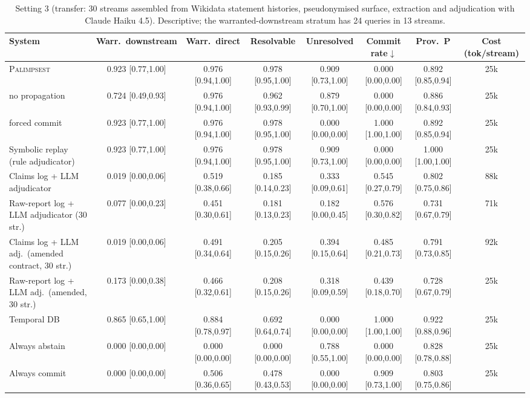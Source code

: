 \begin{table}\centering\footnotesize\setlength{\tabcolsep}{3.5pt}
\caption{Setting 3 (transfer: 30 streams assembled from Wikidata statement histories, pseudonymised surface, extraction and adjudication with Claude Haiku 4.5). Descriptive; the warranted-downstream stratum has 24 queries in 13 streams.}\label{tab:s3}
\begin{tabular}{lccccccc}
\toprule
System & Warr.\ downstream & Warr.\ direct & Resolvable & Unresolved & Commit rate$\downarrow$ & Prov.\ P & Cost (tok/stream) \\
\midrule
\textsc{Palimpsest} & 0.923 {\tiny[0.77,1.00]} & 0.976 {\tiny[0.94,1.00]} & 0.978 {\tiny[0.95,1.00]} & 0.909 {\tiny[0.73,1.00]} & 0.000 {\tiny[0.00,0.00]} & 0.892 {\tiny[0.85,0.94]} & 25k \\
\quad no propagation & 0.724 {\tiny[0.49,0.93]} & 0.976 {\tiny[0.94,1.00]} & 0.962 {\tiny[0.93,0.99]} & 0.879 {\tiny[0.70,1.00]} & 0.000 {\tiny[0.00,0.00]} & 0.886 {\tiny[0.84,0.93]} & 25k \\
\quad forced commit & 0.923 {\tiny[0.77,1.00]} & 0.976 {\tiny[0.94,1.00]} & 0.978 {\tiny[0.95,1.00]} & 0.000 {\tiny[0.00,0.00]} & 1.000 {\tiny[1.00,1.00]} & 0.892 {\tiny[0.85,0.94]} & 25k \\
Symbolic replay (rule adjudicator) & 0.923 {\tiny[0.77,1.00]} & 0.976 {\tiny[0.94,1.00]} & 0.978 {\tiny[0.95,1.00]} & 0.909 {\tiny[0.73,1.00]} & 0.000 {\tiny[0.00,0.00]} & 1.000 {\tiny[1.00,1.00]} & 25k \\
Claims log + LLM adjudicator & 0.019 {\tiny[0.00,0.06]} & 0.519 {\tiny[0.38,0.66]} & 0.185 {\tiny[0.14,0.23]} & 0.333 {\tiny[0.09,0.61]} & 0.545 {\tiny[0.27,0.79]} & 0.802 {\tiny[0.75,0.86]} & 88k \\
Raw-report log + LLM adjudicator (30 str.) & 0.077 {\tiny[0.00,0.23]} & 0.451 {\tiny[0.30,0.61]} & 0.181 {\tiny[0.13,0.23]} & 0.182 {\tiny[0.00,0.45]} & 0.576 {\tiny[0.30,0.82]} & 0.731 {\tiny[0.67,0.79]} & 71k \\
Claims log + LLM adj.\ (amended contract, 30 str.) & 0.019 {\tiny[0.00,0.06]} & 0.491 {\tiny[0.34,0.64]} & 0.205 {\tiny[0.15,0.26]} & 0.394 {\tiny[0.15,0.64]} & 0.485 {\tiny[0.21,0.73]} & 0.791 {\tiny[0.73,0.85]} & 92k \\
Raw-report log + LLM adj.\ (amended, 30 str.) & 0.173 {\tiny[0.00,0.38]} & 0.466 {\tiny[0.32,0.61]} & 0.208 {\tiny[0.15,0.26]} & 0.318 {\tiny[0.09,0.59]} & 0.439 {\tiny[0.18,0.70]} & 0.728 {\tiny[0.67,0.79]} & 25k \\
Temporal DB & 0.865 {\tiny[0.65,1.00]} & 0.884 {\tiny[0.78,0.97]} & 0.692 {\tiny[0.64,0.74]} & 0.000 {\tiny[0.00,0.00]} & 1.000 {\tiny[1.00,1.00]} & 0.922 {\tiny[0.88,0.96]} & 25k \\
Always abstain & 0.000 {\tiny[0.00,0.00]} & 0.000 {\tiny[0.00,0.00]} & 0.000 {\tiny[0.00,0.00]} & 0.788 {\tiny[0.55,1.00]} & 0.000 {\tiny[0.00,0.00]} & 0.828 {\tiny[0.78,0.88]} & 25k \\
Always commit & 0.000 {\tiny[0.00,0.00]} & 0.506 {\tiny[0.36,0.65]} & 0.478 {\tiny[0.43,0.53]} & 0.000 {\tiny[0.00,0.00]} & 0.909 {\tiny[0.73,1.00]} & 0.803 {\tiny[0.75,0.86]} & 25k \\
\bottomrule
\end{tabular}
\end{table}